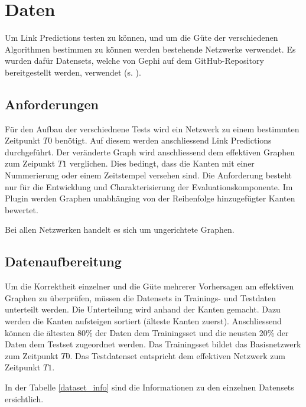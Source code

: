 \usepackage{natbib}

\chapter{Daten}
Um Link Predictions testen zu können, und um die Güte der verschiedenen Algorithmen bestimmen zu können werden bestehende Netzwerke verwendet.
Es wurden dafür Datensets, welche von Gephi auf dem GitHub-Repository bereitgestellt werden, verwendet (s. \cite{moll_datasets_2018}).

\section{Anforderungen}
Für den Aufbau der verschiednene Tests wird ein Netzwerk zu einem bestimmten Zeitpunkt $T0$ benötigt.
Auf diesem werden anschliessend Link Predictions durchgeführt.
Der veränderte Graph wird anschliessend dem effektiven Graphen zum Zeipunkt $T1$ verglichen.
Dies bedingt, dass die Kanten mit einer Nummerierung oder einem Zeitstempel versehen sind.
Die Anforderung besteht nur für die Entwicklung und Charakterisierung der Evaluationskomponente.
Im Plugin werden Graphen unabhänging von der Reihenfolge hinzugefügter Kanten bewertet.

Bei allen Netzwerken handelt es sich um ungerichtete Graphen.

\section{Datenaufbereitung}
Um die Korrektheit einzelner und die Güte mehrerer Vorhersagen am effektiven Graphen zu überprüfen, müssen die Datensets in Trainings- und Testdaten unterteilt werden.
Die Unterteilung wird anhand der Kanten gemacht. Dazu werden die Kanten aufsteigen sortiert (älteste Kanten zuerst).
Anschliessend können die ältesten 80\% der Daten dem Trainingsset und die neusten 20\% der Daten dem Testset zugeordnet werden.
Das Trainingsset bildet das Basisnetzwerk zum Zeitpunkt $T0$.
Das Testdatenset entspricht dem effektiven Netzwerk zum Zeitpunkt $T1$.

In der Tabelle \ref{dataset_info} sind die Informationen zu den einzelnen Datensets ersichtlich.

